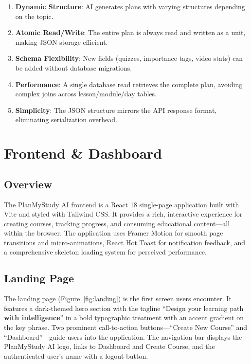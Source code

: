\documentclass[12pt,a4paper]{report}
\begin{document}
\begin{enumerate}[noitemsep]
    \item \textbf{Dynamic Structure}: AI generates plans with varying structures depending on the topic.
    \item \textbf{Atomic Read/Write}: The entire plan is always read and written as a unit, making JSON storage efficient.
    \item \textbf{Schema Flexibility}: New fields (quizzes, importance tags, video stats) can be added without database migrations.
    \item \textbf{Performance}: A single database read retrieves the complete plan, avoiding complex joins across lesson/module/day tables.
    \item \textbf{Simplicity}: The JSON structure mirrors the API response format, eliminating serialization overhead.
\end{enumerate}


\chapter{Frontend \& Dashboard}

\section{Overview}
The PlanMyStudy AI frontend is a React 18 single-page application built with Vite and styled with Tailwind CSS. It provides a rich, interactive experience for creating courses, tracking progress, and consuming educational content---all within the browser. The application uses Framer Motion for smooth page transitions and micro-animations, React Hot Toast for notification feedback, and a comprehensive skeleton loading system for perceived performance.

\section{Landing Page}
The landing page (Figure~\ref{fig:landing}) is the first screen users encounter. It features a dark-themed hero section with the tagline ``Design your learning path \textbf{with intelligence}'' in a bold typographic treatment with an accent gradient on the key phrase. Two prominent call-to-action buttons---``Create New Course'' and ``Dashboard''---guide users into the application. The navigation bar displays the PlanMyStudy AI logo, links to Dashboard and Create Course, and the authenticated user's name with a logout button.
\end{document}
